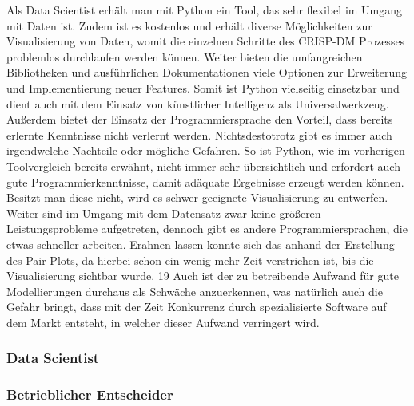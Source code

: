 \documentclass[12pt]{article}
\begin{document}
	Als Data Scientist erhält man mit Python ein Tool, das sehr flexibel im Umgang mit Daten
	ist. Zudem ist es kostenlos und erhält diverse Möglichkeiten zur Visualisierung von
	Daten, womit die einzelnen Schritte des CRISP-DM Prozesses problemlos durchlaufen
	werden können.
	Weiter bieten die umfangreichen Bibliotheken und ausführlichen Dokumentationen
	viele Optionen zur Erweiterung und Implementierung neuer Features. Somit ist Python
	vielseitig einsetzbar und dient auch mit dem Einsatz von künstlicher Intelligenz als
	Universalwerkzeug.
	Außerdem bietet der Einsatz der Programmiersprache den Vorteil, dass bereits erlernte
	Kenntnisse nicht verlernt werden.
	Nichtsdestotrotz gibt es immer auch irgendwelche Nachteile oder mögliche Gefahren.
	So ist Python, wie im vorherigen Toolvergleich bereits erwähnt, nicht immer sehr
	übersichtlich und erfordert auch gute Programmierkenntnisse, damit adäquate
	Ergebnisse erzeugt werden können. Besitzt man diese nicht, wird es schwer geeignete
	Visualisierung zu entwerfen.
	Weiter sind im Umgang mit dem Datensatz zwar keine größeren Leistungsprobleme
	aufgetreten, dennoch gibt es andere Programmiersprachen, die etwas schneller
	arbeiten. Erahnen lassen konnte sich das anhand der Erstellung des Pair-Plots, da
	hierbei schon ein wenig mehr Zeit verstrichen ist, bis die Visualisierung sichtbar wurde.
	19
	Auch ist der zu betreibende Aufwand für gute Modellierungen durchaus als Schwäche
	anzuerkennen, was natürlich auch die Gefahr bringt, dass mit der Zeit Konkurrenz durch
	spezialisierte Software auf dem Markt entsteht, in welcher dieser Aufwand verringert wird.
	
	\subsubsection{Data Scientist}
	
	\subsubsection{Betrieblicher Entscheider}
	
\end{document}
